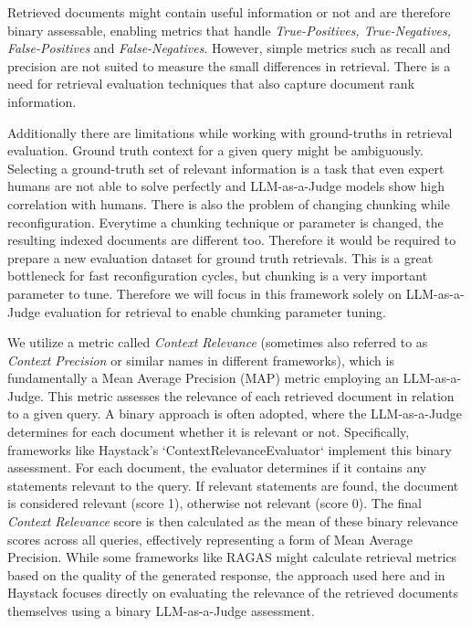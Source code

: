 Retrieved documents might contain useful information or not and are therefore binary assessable, enabling metrics that handle \textit{True-Positives, True-Negatives, False-Positives} and \textit{False-Negatives}. However, simple metrics such as recall and precision are not suited to measure the small differences in retrieval.\cite{Yu.2024} There is a need for retrieval evaluation techniques that also capture document rank information.

Additionally there are limitations while working with ground-truths in retrieval evaluation. Ground truth context for a given query might be ambiguously. Selecting a ground-truth set of relevant information is a task that even expert humans are not able to solve perfectly and LLM-as-a-Judge models show high correlation with humans.\cite{Chiang.2023} There is also the problem of changing chunking while reconfiguration. Everytime a chunking technique or parameter is changed, the resulting indexed documents are different too. Therefore it would be required to prepare a new evaluation dataset for ground truth retrievals. This is a great bottleneck for fast reconfiguration cycles, but chunking is a very important parameter to tune. Therefore we will focus in this framework solely on LLM-as-a-Judge evaluation for retrieval to enable chunking parameter tuning.

We utilize a metric called \textit{Context Relevance} (sometimes also referred to as \textit{Context Precision} or similar names in different frameworks), which is fundamentally a Mean Average Precision (MAP) metric employing an LLM-as-a-Judge. This metric assesses the relevance of each retrieved document in relation to a given query. A binary approach is often adopted, where the LLM-as-a-Judge determines for each document whether it is relevant or not. Specifically, frameworks like Haystack's `ContextRelevanceEvaluator`\cite{Pietsch_Haystack_the_end-to-end_2019} implement this binary assessment. For each document, the evaluator determines if it contains any statements relevant to the query. If relevant statements are found, the document is considered relevant (score 1), otherwise not relevant (score 0). The final \textit{Context Relevance} score is then calculated as the mean of these binary relevance scores across all queries, effectively representing a form of Mean Average Precision. While some frameworks like RAGAS might calculate retrieval metrics based on the quality of the generated response, the approach used here and in Haystack focuses directly on evaluating the relevance of the retrieved documents themselves using a binary LLM-as-a-Judge assessment.

